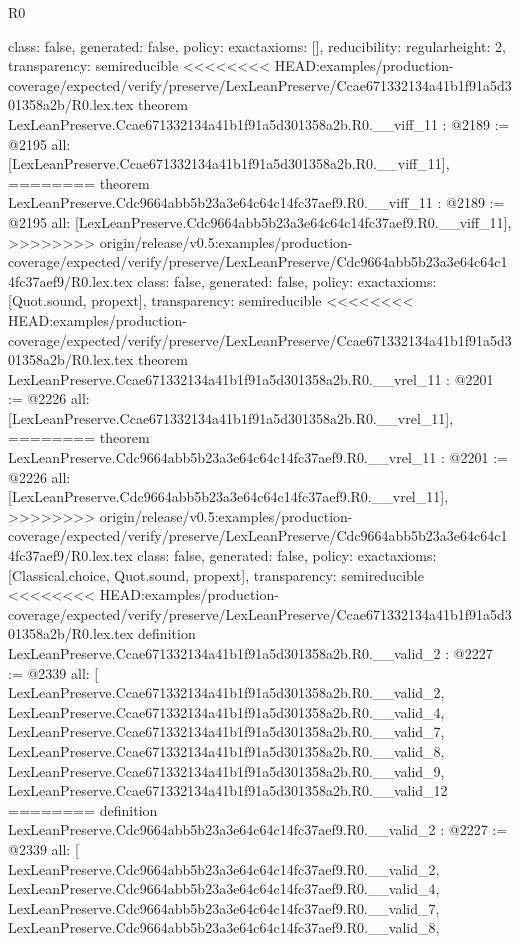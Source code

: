 \begin{lexlean}{R0}
\begin{coremodule}
{{{{{{{{{{{{{{{{{{{{{{{{{{{{{{{{{{{{{{{{{{  class: false,
  generated: false,
  policy: exact{axioms: []},
  reducibility: regular{height: 2},
  transparency: semireducible
}
<<<<<<<< HEAD:examples/production-coverage/expected/verify/preserve/LexLeanPreserve/Ccae671332134a41b1f91a5d301358a2b/R0.lex.tex
theorem LexLeanPreserve.Ccae671332134a41b1f91a5d301358a2b.R0.__viff_11 : @2189 := @2195 {
  all: [LexLeanPreserve.Ccae671332134a41b1f91a5d301358a2b.R0.__viff_11],
========
theorem LexLeanPreserve.Cdc9664abb5b23a3e64c64c14fc37aef9.R0.__viff_11 : @2189 := @2195 {
  all: [LexLeanPreserve.Cdc9664abb5b23a3e64c64c14fc37aef9.R0.__viff_11],
>>>>>>>> origin/release/v0.5:examples/production-coverage/expected/verify/preserve/LexLeanPreserve/Cdc9664abb5b23a3e64c64c14fc37aef9/R0.lex.tex
  class: false,
  generated: false,
  policy: exact{axioms: [Quot.sound, propext]},
  transparency: semireducible
}
<<<<<<<< HEAD:examples/production-coverage/expected/verify/preserve/LexLeanPreserve/Ccae671332134a41b1f91a5d301358a2b/R0.lex.tex
theorem LexLeanPreserve.Ccae671332134a41b1f91a5d301358a2b.R0.__vrel_11 : @2201 := @2226 {
  all: [LexLeanPreserve.Ccae671332134a41b1f91a5d301358a2b.R0.__vrel_11],
========
theorem LexLeanPreserve.Cdc9664abb5b23a3e64c64c14fc37aef9.R0.__vrel_11 : @2201 := @2226 {
  all: [LexLeanPreserve.Cdc9664abb5b23a3e64c64c14fc37aef9.R0.__vrel_11],
>>>>>>>> origin/release/v0.5:examples/production-coverage/expected/verify/preserve/LexLeanPreserve/Cdc9664abb5b23a3e64c64c14fc37aef9/R0.lex.tex
  class: false,
  generated: false,
  policy: exact{axioms: [Classical.choice, Quot.sound, propext]},
  transparency: semireducible
}
<<<<<<<< HEAD:examples/production-coverage/expected/verify/preserve/LexLeanPreserve/Ccae671332134a41b1f91a5d301358a2b/R0.lex.tex
definition LexLeanPreserve.Ccae671332134a41b1f91a5d301358a2b.R0.__valid_2 : @2227 := @2339 {
  all: [
    LexLeanPreserve.Ccae671332134a41b1f91a5d301358a2b.R0.__valid_2,
    LexLeanPreserve.Ccae671332134a41b1f91a5d301358a2b.R0.__valid_4,
    LexLeanPreserve.Ccae671332134a41b1f91a5d301358a2b.R0.__valid_7,
    LexLeanPreserve.Ccae671332134a41b1f91a5d301358a2b.R0.__valid_8,
    LexLeanPreserve.Ccae671332134a41b1f91a5d301358a2b.R0.__valid_9,
    LexLeanPreserve.Ccae671332134a41b1f91a5d301358a2b.R0.__valid_12
========
definition LexLeanPreserve.Cdc9664abb5b23a3e64c64c14fc37aef9.R0.__valid_2 : @2227 := @2339 {
  all: [
    LexLeanPreserve.Cdc9664abb5b23a3e64c64c14fc37aef9.R0.__valid_2,
    LexLeanPreserve.Cdc9664abb5b23a3e64c64c14fc37aef9.R0.__valid_4,
    LexLeanPreserve.Cdc9664abb5b23a3e64c64c14fc37aef9.R0.__valid_7,
    LexLeanPreserve.Cdc9664abb5b23a3e64c64c14fc37aef9.R0.__valid_8,
}}}}}}}}}}}}}}}}}}}}}}}}}}}}}}}}}}}}}}}}}}}}}
\end{coremodule}
\end{lexlean}
